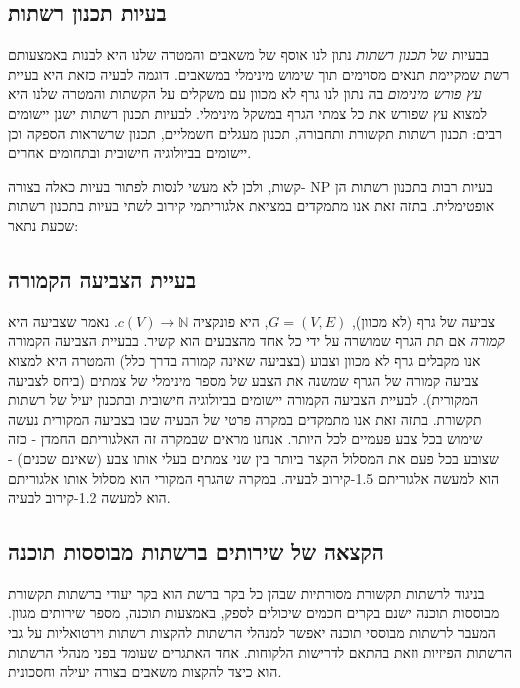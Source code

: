 \begin{hebrew}
\section*{\texthebrew{בעיות תכנון רשתות}}
בבעיות של
\emph{תכנון רשתות}
נתון לנו אוסף של משאבים והמטרה שלנו היא לבנות באמצעותם רשת שמקיימת תנאים מסוימים תוך שימוש מינימלי במשאבים.
דוגמה לבעיה כזאת היא בעיית
\emph{עץ פורש מינימום}
בה נתון לנו גרף לא מכוון עם משקלים על הקשתות והמטרה שלנו היא למצוא עץ שפורש את כל צמתי הגרף במשקל מינימלי.
לבעיות תכנון רשתות ישנן יישומים רבים: תכנון רשתות תקשורת ותחבורה, תכנון מעגלים חשמליים, תכנון שרשראות הספקה וכן יישומים  בביולוגיה חישובית ובתחומים אחרים.

בעיות רבות בתכנון רשתות הן
$\text{NP}$
-קשות, ולכן לא מעשי לנסות לפתור בעיות כאלה בצורה אופטימלית.
בתזה זאת אנו מתמקדים במציאת אלגוריתמי קירוב לשתי בעיות בתכנון רשתות שכעת נתאר:

\subsection*{\texthebrew{בעיית הצביעה הקמורה}}
צביעה של גרף (לא מכוון),
$G = (V, E)$,
 היא פונקציה
$c(V) \to \mathbb{N}$.
נאמר שצביעה היא
\emph{קמורה}
אם תת הגרף שמושרה על ידי כל אחד מהצבעים הוא קשיר.
בבעיית הצביעה הקמורה אנו מקבלים גרף לא מכוון וצבוע (בצביעה שאינה קמורה בדרך כלל) והמטרה היא למצוא צביעה קמורה של הגרף שמשנה את הצבע של מספר מינימלי של צמתים (ביחס לצביעה המקורית).
לבעיית הצביעה הקמורה יישומים בביולוגיה חישובית ובתכנון יעיל של רשתות תקשורת.
בתזה זאת אנו מתמקדים במקרה פרטי של הבעיה שבו בצביעה המקורית נעשה שימוש בכל צבע פעמיים לכל היותר.
אנחנו מראים שבמקרה זה האלגוריתם החמדן - כזה שצובע בכל פעם את המסלול הקצר ביותר בין שני צמתים בעלי אותו צבע (שאינם שכנים) - הוא למעשה אלגוריתם 1.5-קירוב לבעיה.
במקרה שהגרף המקורי הוא מסלול אותו אלגוריתם הוא למעשה 1.2-קירוב לבעיה.


\subsection*{\texthebrew{הקצאה של שירותים ברשתות מבוססות תוכנה}}
בניגוד לרשתות תקשורת מסורתיות שבהן כל בקר ברשת הוא בקר יעודי ברשתות תקשורת מבוססות תוכנה ישנם בקרים חכמים שיכולים לספק, באמצעות תוכנה, מספר שירותים מגוון.
המעבר לרשתות מבוססי תוכנה יאפשר למנהלי הרשתות להקצות רשתות וירטואליות על גבי הרשתות הפיזיות וזאת בהתאם לדרישות הלקוחות.
אחד האתגרים שעומד בפני מנהלי הרשתות הוא כיצד להקצות משאבים בצורה יעילה וחסכונית.


\end{hebrew}
